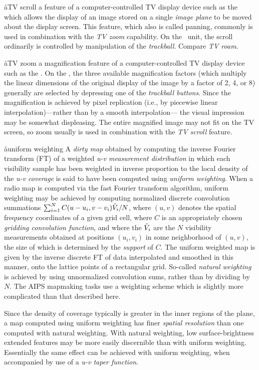 \aa{TV scroll}
a feature of a computer-controlled TV display device
such as the {\it\iis}\ %
which allows the display of an image stored on a single {\it image plane}
to be moved about the display screen.
This feature, which also is called panning,
commonly is used in combination with the {\it TV zoom} capability.
On the \iis\ unit, the scroll ordinarily is controlled by manipulation
of the {\it trackball}.
Compare {\it TV roam}.

\aa{TV zoom}
a magnification feature
of a computer-controlled TV display device such as the {\it\iis}.
On the \iis, the three available magnification factors
(which multiply the linear dimensions of the original display of the image
by a factor of 2, 4, or 8)
generally are selected by depressing one of the {\it trackball buttons}.
Since the magnification is achieved by pixel replication (i.e.,
by piecewise linear interpolation)---rather than by a smooth interpolation---%
the visual impression may be somewhat displeasing.
The entire magnified image may not fit on the TV screen,
so zoom usually is used in combination with the {\it TV scroll}
feature.

\aa{uniform weighting}
A {\it dirty map} obtained by computing the inverse Fourier
transform (FT) of a weighted {\it u-v measurement distribution}
in which each visibility sample has been weighted in inverse
proportion to the local density of the {\it u-v coverage}
is said to have been computed using {\it uniform weighting}.
When a radio map is computed via the fast Fourier transform algorithm,
uniform weighting may be achieved
by computing normalized discrete convolution summations
$\sum_{i=1}^N C(u-u_i,v-v_i)\tilde V_i/N$,
where $(u,v)$ denotes the spatial frequency coordinates of a given
\uv grid cell, where
$C$ is an appropriately chosen {\it gridding convolution function},
and where
the $\tilde V_i$ are the $N$ visibility measurements obtained
at positions $(u_i,v_i)$ in some neighborhood
of $(u,v)$, the size of which is determined by the {\it support} of $C$.
The uniform weighted map is given by the inverse discrete FT
of data interpolated and smoothed in this manner, onto the lattice
points of a rectangular grid.
So-called {\it natural weighting} is achieved by using unnormalized
convolution sums, rather than by dividing by $N$.
The AIPS mapmaking tasks use a weighting scheme which is slightly
more complicated than that described here.
\par
Since the density of \uv coverage typically is greater in
the inner regions of the \uv plane,
a map computed using uniform weighting has finer {\it spatial
resolution} than one computed with natural weighting.
With natural weighting, low surface-brightness extended features
may be more easily discernible than with uniform weighting.
Essentially the same effect can be achieved with uniform weighting,
when accompanied by use of a {\it u-v taper function}.

